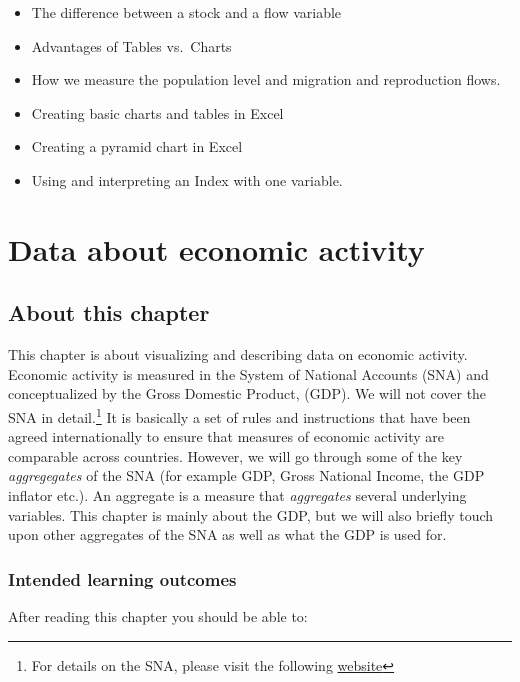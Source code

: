 \documentclass[]{book}
\providecommand{\tightlist}{%
  \setlength{\itemsep}{0pt}\setlength{\parskip}{0pt}}
\let\rmarkdownfootnote\footnote%
\def\footnote{\protect\rmarkdownfootnote}
\begin{document}
\begin{itemize}
\tightlist
\item
  The difference between a stock and a flow variable
\item
  Advantages of Tables vs.~Charts
\item
  How we measure the population level and migration and reproduction flows.
\item
  Creating basic charts and tables in Excel
\item
  Creating a pyramid chart in Excel
\item
  Using and interpreting an Index with one variable.
\end{itemize}

\hypertarget{activity}{%
\chapter{Data about economic activity}\label{activity}}

\hypertarget{about-this-chapter-1}{%
\section{About this chapter}\label{about-this-chapter-1}}

This chapter is about visualizing and describing data on economic activity. Economic activity is measured in the System of National Accounts (SNA) and conceptualized by the Gross Domestic Product, (GDP). We will not cover the SNA in detail.\footnote{For details on the SNA, please visit the following \href{https://unstats.un.org/unsd/nationalaccount/sna.asp}{website}} It is basically a set of rules and instructions that have been agreed internationally to ensure that measures of economic activity are comparable across countries. However, we will go through some of the key \emph{aggregegates} of the SNA (for example GDP, Gross National Income, the GDP inflator etc.). An aggregate is a measure that \emph{aggregates} several underlying variables. This chapter is mainly about the GDP, but we will also briefly touch upon other aggregates of the SNA as well as what the GDP is used for.

\hypertarget{intended-learning-outcomes-1}{%
\subsection{Intended learning outcomes}\label{intended-learning-outcomes-1}}

After reading this chapter you should be able to:
\end{document}
